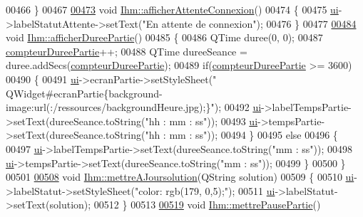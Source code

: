 \begin{DoxyCode}
00466 \}
00467 
\hyperlink{class_ihm_a46f511e7be2c138a8fe2dec17d6bb2bf}{00473} \textcolor{keywordtype}{void} \hyperlink{class_ihm_a46f511e7be2c138a8fe2dec17d6bb2bf}{Ihm::afficherAttenteConnexion}()
00474 \{
00475     \hyperlink{class_ihm_a0ac5f47856566ceeeca1720109bf70ea}{ui}->labelStatutAttente->setText(\textcolor{stringliteral}{"En attente de connexion"});
00476 \}
00477 
\hyperlink{class_ihm_a808bd550b877499a38419a492595822e}{00484} \textcolor{keywordtype}{void} \hyperlink{class_ihm_a808bd550b877499a38419a492595822e}{Ihm::afficherDureePartie}()
00485 \{
00486     QTime duree(0, 0);
00487     \hyperlink{class_ihm_a61e4a83f8ca0f177971af808e51be5bb}{compteurDureePartie}++;
00488     QTime dureeSeance = duree.addSecs(\hyperlink{class_ihm_a61e4a83f8ca0f177971af808e51be5bb}{compteurDureePartie});
00489     \textcolor{keywordflow}{if}(\hyperlink{class_ihm_a61e4a83f8ca0f177971af808e51be5bb}{compteurDureePartie} >= 3600)
00490     \{
00491         \hyperlink{class_ihm_a0ac5f47856566ceeeca1720109bf70ea}{ui}->ecranPartie->setStyleSheet(\textcolor{stringliteral}{"
      QWidget#ecranPartie\{background-image:url(:/ressources/backgroundHeure.jpg);\}"});
00492         \hyperlink{class_ihm_a0ac5f47856566ceeeca1720109bf70ea}{ui}->labelTempsPartie->setText(dureeSeance.toString(\textcolor{stringliteral}{"hh : mm : ss"}));
00493         \hyperlink{class_ihm_a0ac5f47856566ceeeca1720109bf70ea}{ui}->tempsPartie->setText(dureeSeance.toString(\textcolor{stringliteral}{"hh : mm : ss"}));
00494     \}
00495     \textcolor{keywordflow}{else}
00496     \{
00497         \hyperlink{class_ihm_a0ac5f47856566ceeeca1720109bf70ea}{ui}->labelTempsPartie->setText(dureeSeance.toString(\textcolor{stringliteral}{"mm : ss"}));
00498         \hyperlink{class_ihm_a0ac5f47856566ceeeca1720109bf70ea}{ui}->tempsPartie->setText(dureeSeance.toString(\textcolor{stringliteral}{"mm : ss"}));
00499     \}
00500 \}
00501 
\hyperlink{class_ihm_a27b24d133887431399b4696a4eae02e6}{00508} \textcolor{keywordtype}{void} \hyperlink{class_ihm_a27b24d133887431399b4696a4eae02e6}{Ihm::mettreAJoursolution}(QString solution)
00509 \{
00510     \hyperlink{class_ihm_a0ac5f47856566ceeeca1720109bf70ea}{ui}->labelStatut->setStyleSheet(\textcolor{stringliteral}{"color: rgb(179, 0,5);"});
00511     \hyperlink{class_ihm_a0ac5f47856566ceeeca1720109bf70ea}{ui}->labelStatut->setText(solution);
00512 \}
00513 
\hyperlink{class_ihm_ab8456da276715f99ba373b71313592de}{00519} \textcolor{keywordtype}{void} \hyperlink{class_ihm_ab8456da276715f99ba373b71313592de}{Ihm::mettrePausePartie}()

\end{DoxyCode}

